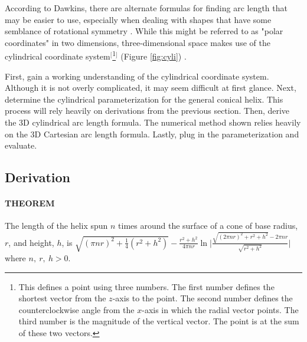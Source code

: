 \documentclass{article}
\begin{document}
According to Dawkins, there are alternate formulas for finding arc length that may be easier to use, especially when dealing with shapes that have some semblance of rotational symmetry \cite{Bib:polararc}. While this might be referred to as "polar coordinates" in two dimensions, three-dimensional space makes use of the cylindrical coordinate system$^[$\footnote{This defines a point using three numbers. The first number defines the shortest vector from the $z$-axis to the point. The second number defines the counterclockwise angle from the $x$-axis in which the radial vector points. The third number is the magnitude of the vertical vector. The point is at the sum of these two vectors.}$^]$ (Figure \ref{fig:cyli}) \cite{Bib:cylcords}.\par
First, gain a working understanding of the cylindrical coordinate system. Although it is not overly complicated, it may seem difficult at first glance. Next, determine the cylindrical parameterization for the general conical helix. This process will rely heavily on derivations from the previous section. Then, derive the 3D cylindrical arc length formula. The numerical method shown relies heavily on the 3D Cartesian arc length formula. Lastly, plug in the parameterization and evaluate.


\subsection{Derivation}\label{ssec:cyl}
\paragraph{THEOREM} The length of the helix spun $n$ times around the surface of a cone of base radius, $r$, and height, $h$, is $\sqrt{(\pi nr)^2+\frac{1}{4}\left(r^2+h^2\right)}-\frac{r^2+h^2}{4\pi nr}\ln\bigg|\frac{\sqrt{(2\pi nr)^2+r^2+h^2}-2\pi nr}{\sqrt{r^2+h^2}}\bigg|$ where $n,\ r,\ h>0$.
\smallskip
\end{document}
